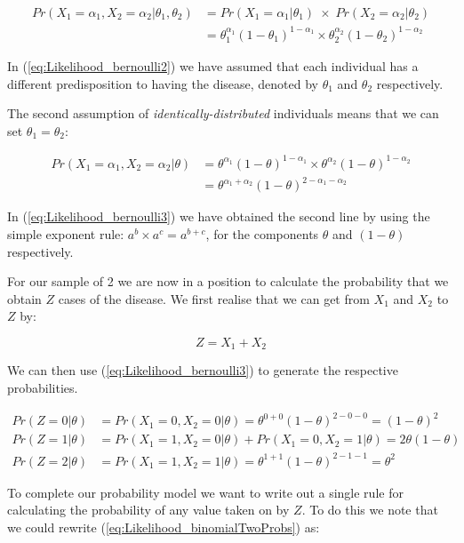 \documentclass[11pt,fullpage]{book}
\begin{document}
\begin{align}\label{eq:Likelihood_bernoulli2}
Pr(X_1=\alpha_1,X_2=\alpha_2|\theta_1,\theta_2) &= Pr(X_1=\alpha_1|\theta_1)\;\times \;Pr(X_2=\alpha_2|\theta_2)\\
 &= \theta_1^{\alpha_1}(1-\theta_1)^{1-\alpha_1}\times \theta_2^{\alpha_2}(1-\theta_2)^{1-\alpha_2}
\end{align}

In (\ref{eq:Likelihood_bernoulli2}) we have assumed that each individual has a different predisposition to having the disease, denoted by $\theta_1$ and $\theta_2$ respectively.

The second assumption of \textit{identically-distributed} individuals means that we can set $\theta_1=\theta_2$:

\begin{align}\label{eq:Likelihood_bernoulli3}
 Pr(X_1=\alpha_1,X_2=\alpha_2|\theta) &= \theta^{\alpha_1}(1-\theta)^{1-\alpha_1}\times \theta^{\alpha_2}(1-\theta)^{1-\alpha_2}\\
&= \theta^{\alpha_1+\alpha_2}(1-\theta)^{2-\alpha_1-\alpha_2}
\end{align}

In (\ref{eq:Likelihood_bernoulli3}) we have obtained the second line by using the simple exponent rule: $a^b\times a^c = a^{b+c}$, for the components $\theta$ and $(1-\theta)$ respectively.

For our sample of 2 we are now in a position to calculate the probability that we obtain $Z$ cases of the disease. We first realise that we can get from $X_1$ and $X_2$ to $Z$ by:

\begin{equation}\label{eq:Likelihood_binomialTwo}
Z = X_1 + X_2
\end{equation}

We can then use (\ref{eq:Likelihood_bernoulli3}) to generate the respective probabilities.

\begin{align}\label{eq:Likelihood_binomialTwoProbs}
Pr(Z = 0|\theta)& = Pr(X_1=0,X_2=0|\theta) = \theta^{0+0}(1-\theta)^{2-0-0} = (1-\theta)^2\\
Pr(Z = 1|\theta)& = Pr(X_1=1,X_2=0|\theta) + Pr(X_1=0,X_2=1|\theta)= 2\theta(1-\theta)\\
Pr(Z = 2|\theta)& = Pr(X_1=1,X_2=1|\theta) = \theta^{1+1}(1-\theta)^{2-1-1} = \theta^2
\end{align}

To complete our probability model we want to write out a single rule for calculating the probability of any value taken on by $Z$. To do this we note that we could rewrite (\ref{eq:Likelihood_binomialTwoProbs}) as:
\end{document}
